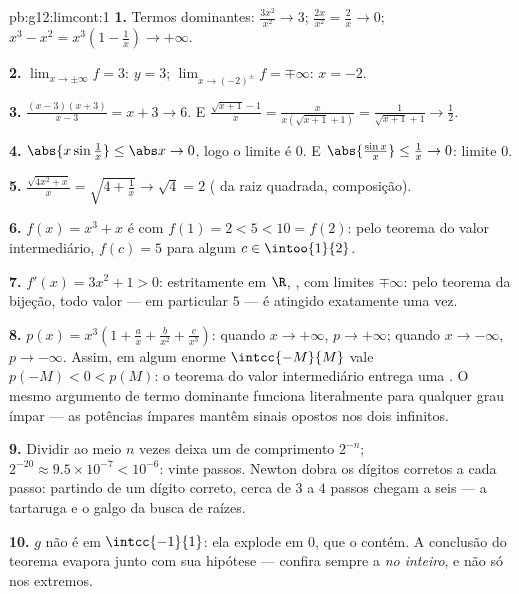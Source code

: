 \begin{solution}{pb:g12:limcont:1}
\textbf{1.} Termos dominantes: $\frac{3x^2}{x^2} \to 3$;
$\frac{2x}{x^2} = \frac2x \to 0$;
$x^3 - x^2 = x^3\left(1 - \frac1x\right) \to +\infty$.

\textbf{2.} $\lim_{x \to \pm\infty} f = 3$: 
$y = 3$; $\lim_{x \to (-2)^\pm} f = \mp\infty$:  $x = -2$.

\textbf{3.} $\frac{(x-3)(x+3)}{x - 3} = x + 3 \to 6$. E
$\frac{\sqrt{x+1} - 1}{x} = \frac{x}{x(\sqrt{x+1} + 1)} =
\frac{1}{\sqrt{x+1} + 1} \to \frac12$.

\textbf{4.} $\abs{x \sin\frac1x} \leq \abs x \to 0$, logo o
limite é $0$. E $\abs{\frac{\sin x}{x}} \leq \frac1x \to 0$:
limite $0$.

\textbf{5.} $\frac{\sqrt{4x^2 + x}}{x} =
\sqrt{4 + \frac1x} \to \sqrt4 = 2$ ( da raiz
quadrada, composição).

\textbf{6.} $f(x) = x^3 + x$ é  com
$f(1) = 2 < 5 < 10 = f(2)$: pelo teorema do valor
intermediário, $f(c) = 5$ para algum $c \in \intoo{1}{2}$.

\textbf{7.} $f'(x) = 3x^2 + 1 > 0$: estritamente  em
$\R$, , com limites $\mp\infty$: pelo teorema da
bijeção, todo valor --- em particular $5$ --- é atingido
exatamente uma vez.

\textbf{8.} $p(x) = x^3\left(1 + \frac ax + \frac{b}{x^2} +
\frac{c}{x^3}\right)$: quando $x \to +\infty$, $p \to +\infty$;
quando $x \to -\infty$, $p \to -\infty$. Assim, em algum
 enorme $\intcc{-M}{M}$ vale $p(-M) < 0 < p(M)$: o
teorema do valor intermediário entrega uma . O mesmo
argumento de termo dominante funciona literalmente para
qualquer grau ímpar --- as potências ímpares mantêm sinais
opostos nos dois infinitos.

\textbf{9.} Dividir ao meio $n$ vezes deixa um  de
comprimento $2^{-n}$; $2^{-20} \approx 9.5 \times 10^{-7} <
10^{-6}$: vinte passos. Newton dobra os dígitos corretos a cada
passo: partindo de um dígito correto, cerca de $3$ a $4$ passos
chegam a seis --- a tartaruga e o galgo da busca de raízes.

\textbf{10.} $g$ não é  em $\intcc{-1}{1}$: ela explode
em $0$, que o  contém. A conclusão do teorema evapora
junto com sua hipótese --- confira sempre a 
\emph{no  inteiro}, e não só nos extremos.


\end{solution}
